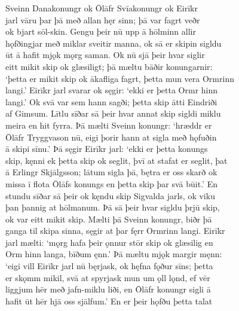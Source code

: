 \documentclass[12pt,letterpaper]{book}
\begin{document}
\begin{linenumbers}
Sveinn Danakonungr ok Ōlāfr Svīakonungr ok Eirīkr\\
jarl vāru þar þā með allan hęr sinn; þā var fagrt veðr\\
ok bjart sōl-skin.  Gengu þeir nū upp ā hōlminn allir\\
hǫfðingjar með miklar sveitir manna, ok sā er skipin sigldu\\
ūt ā hafit mjǫk mǫrg saman.  Ok nū sjā þeir hvar siglir\\
eitt mikit skip ok glæsiligt; þā mæltu bāðir konungarnir:\\
`þetta er mikit skip ok ākafliga fagrt, þetta mun vera Ormrinn\\
langi.'  Eirīkr jarl svarar ok sęgir: `ekki er þetta Ormr hinn\\
langi.'  Ok svā var sem hann sagði; þetta skip ātti Eindriði\\
af Gimsum.  Lītlu sīðar sā þeir hvar annat skip sigldi miklu\\
meira en hit fyrra.  Þā mælti Sveinn konungr: `hræddr er\\
Ōlāfr Tryggvason nū, eigi þorir hann at sigla með hǫfuðin\\
ā skipi sīnu.'  Þā sęgir Eirīkr jarl: `ekki er þetta konungs\\
skip, kęnni ek þetta skip ok seglit, þvī at stafat er seglit, þat\\
ā Erlingr Skjālgsson; lātum sigla þā, bętra er oss skarð ok\\
missa ī flota Ōlāfs konungs en þetta skip þar svā būit.'  En\\
stundu sīðar sā þeir ok kęndu skip Sigvalda jarls, ok viku\\
þan þannig at hōlmanum.  Þā sā þeir hvar sigldu þrjū skip,\\
ok var eitt mikit skip.  Mælti þā Sveinn konungr, biðr þā\\
ganga til skipa sinna, sęgir at þar fęrr Ormrinn langi.  Eirīkr\\
jarl mælti: `mǫrg hafa þeir ǫnnur stōr skip ok glæsilig en\\
Orm hinn langa, bīðum ęnn.'  Þā mæltu mjǫk margir męnn:\\
`eigi vill Eirīkr jarl nū bęrjask, ok hęfna fǫður sīns; þetta\\
er skǫmm mikil, svā at spyrjask mun um ǫll lǫnd, ef vēr\\
liggjum hēr með jafn-miklu liði, en Ōlāfr konungr sigli ā\\
hafit ūt hēr hjā oss sjālfum.'  En er þeir hǫfðu þetta talat\\

\end{linenumbers}
\end{document}
